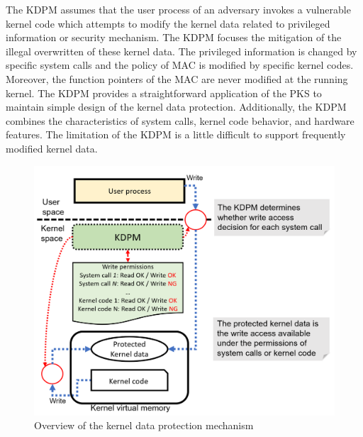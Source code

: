 %
The KDPM assumes that the user process of an adversary invokes a vulnerable
kernel code which attempts to modify the kernel data related to privileged
information or security mechanism.
%
The KDPM focuses the mitigation of the illegal overwritten of these kernel
data.
%
The privileged information is changed by specific system calls and the policy of
MAC is modified by specific kernel codes. Moreover, the function pointers of the MAC
are never modified at the running kernel.
%
The KDPM provides a straightforward application of the PKS to maintain simple
design of the kernel data protection. Additionally, the KDPM combines the
characteristics of system calls, kernel code behavior, and hardware features. 
%
The limitation of the KDPM is a little difficult to support frequently modified kernel data. 


\begin{figure}[tb]
  \centering        
  \includegraphics[bb=0 0 972 809, scale=.240]{./imgs/001_screenshot_2021-07-26_17.18.08.png}
  \caption{
    Overview of the kernel data protection mechanism
  }
  \label{fig:approach_overview}
\end{figure}


